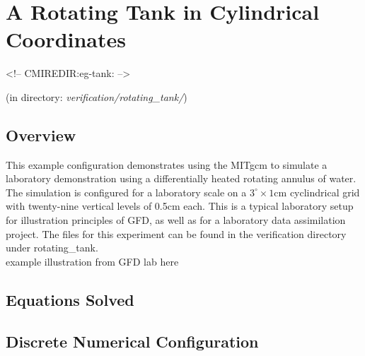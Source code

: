 

%
%

\section{A Rotating Tank in Cylindrical Coordinates}
\label{sec:eg-tank}
\begin{rawhtml}
<!-- CMIREDIR:eg-tank: -->
\end{rawhtml}
\begin{center}
(in directory: {\it verification/rotating\_tank/})
\end{center}

\subsection{Overview}
                                                                          
This example configuration demonstrates using the MITgcm to simulate a
laboratory demonstration using a differentially heated rotating
annulus of water.  The simulation is configured for a laboratory scale
on a $3^{\circ}\times1\mathrm{cm}$ cyclindrical grid with twenty-nine
vertical levels of 0.5cm each.  This is a typical laboratory setup for
illustration principles of GFD, as well as for a laboratory data
assimilation project. The files for this experiment can be found in
the verification directory under rotating\_tank.
\\

example illustration from GFD lab here
\\



 

\subsection{Equations Solved}


\subsection{Discrete Numerical Configuration}

